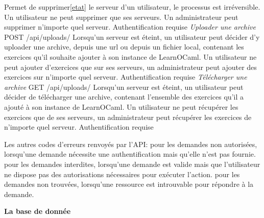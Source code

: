 \documentclass{article}
\begin{document}
Permet de supprimer\ref{etat} le serveur d'un utilisateur, le processus est irréversible.
\newline
Un utilisateur ne peut supprimer que ses serveurs. Un administrateur peut supprimer n'importe quel serveur.
\newline
Authentification requise
\newline
\newline
\textit{Uploader une archive}
\newline
POST /api/uploads/
\newline
Lorsqu'un serveur est éteint, un utilisateur peut décider d'y uploader une archive, depuis une url ou depuis un fichier local, contenant les exercices qu'il souhaite ajouter à son instance de LearnOCaml.
\newline
Un utilisateur ne peut ajouter d'exercices que sur ses serveurs, un administrateur peut ajouter des exercices sur n'importe quel serveur.
\newline
Authentification requise
\newline
\newline
\textit{Télécharger une archive}
\newline
GET /api/uploads/
\newline
Lorsqu'un serveur est éteint, un utilisateur peut décider de télécharger une archive, contenant l'ensemble des exercices qu'il a ajouté à son instance de LearnOCaml.
\newline
Un utilisateur ne peut récupérer les exercices que de ses serveurs, un administrateur peut récupérer les exercices de n'importe quel serveur.
\newline
Authentification requise
\newline
\newline


Les autres codes d'erreurs renvoyés par l'API:
 pour les demandes non autorisées, lorsqu'une demande nécessite une authentification mais qu'elle n'est pas fournie.
 pour les demandes interdites, lorsqu'une demande est valide mais que l'utilisateur ne dispose pas des autorisations nécessaires pour exécuter l'action.
 pour les demandes non trouvées, lorsqu'une ressource est introuvable pour répondre à la demande.

\newpage

\textbf{La base de donnée}


\newpage
\end{document}
